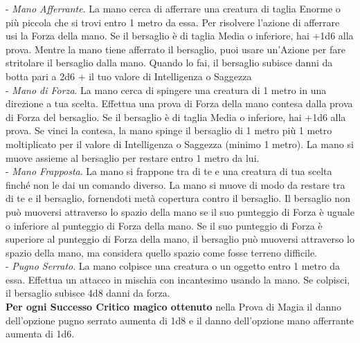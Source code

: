 \begin{multicols}{2}
- \textit{Mano Afferrante}. La mano cerca di afferrare una creatura di taglia Enorme o più piccola che si trovi entro 1 metro da essa. Per risolvere l'azione di afferrare usi la Forza della mano. Se il bersaglio è di taglia Media o inferiore, hai +1d6 alla prova. Mentre la mano tiene afferrato il bersaglio, puoi usare un'Azione per fare stritolare il bersaglio dalla mano. Quando lo fai, il bersaglio subisce danni da botta pari a 2d6 + il tuo valore di Intelligenza o Saggezza\\
- \textit{Mano di Forza}. La mano cerca di spingere una creatura di 1 metro in una direzione a tua scelta. Effettua una prova di Forza della mano contesa dalla prova di Forza del bersaglio. Se il bersaglio è di taglia Media o inferiore, hai +1d6 alla prova. Se vinci la contesa, la mano spinge il bersaglio di 1 metro più 1 metro moltiplicato per il valore di Intelligenza o Saggezza (minimo 1 metro). La mano si muove assieme al bersaglio per restare entro 1 metro da lui.\\
- \textit{Mano Frapposta}. La mano si frappone tra di te e una creatura di tua scelta finché non le dai un comando diverso. La mano si muove di modo da restare tra di te e il bersaglio, fornendoti metà copertura contro il bersaglio. Il bersaglio non può muoversi attraverso lo spazio della mano se il suo punteggio di Forza è uguale o inferiore al punteggio di Forza della mano. Se il suo punteggio di Forza è superiore al punteggio di Forza della mano, il bersaglio può muoversi attraverso lo spazio della mano, ma considera quello spazio come fosse terreno difficile. \\
- \textit{Pugno Serrato}. La mano colpisce una creatura o un oggetto entro 1 metro da essa. Effettua un attacco in mischia con incantesimo usando la mano. Se colpisci, il bersaglio subisce 4d8 danni da forza.\\

\medskip
\textbf{Per ogni Successo Critico magico ottenuto} nella Prova di Magia il danno dell'opzione pugno serrato aumenta di 1d8 e il danno dell'opzione mano afferrante aumenta di 1d6.


\end{multicols}
